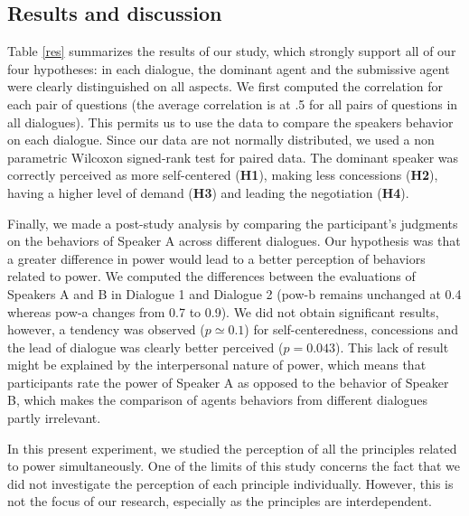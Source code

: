 \documentclass{llncs}
\begin{document}
	\subsection{Results and discussion}
		\vspace{-.5em} 
	Table  \ref{res} summarizes the results of our study, which strongly support all of our four hypotheses: in each dialogue, the dominant agent and the submissive agent were clearly distinguished on all aspects. We first computed the correlation for each pair of questions (the average correlation is at .5 for all pairs of questions in all dialogues). This permits us to use the data to compare the speakers behavior on each dialogue. Since our data are not normally distributed, we used a non parametric Wilcoxon signed-rank test for paired data. The dominant speaker was correctly perceived as more self-centered (\textbf{H1}), making less concessions (\textbf{H2}), having a higher level of demand (\textbf{H3}) and leading the negotiation (\textbf{H4}).
	
	Finally, we made a post-study analysis by comparing the participant's judgments on the behaviors of Speaker A across different dialogues. Our hypothesis was that a greater difference in power would lead to a better perception of behaviors related to power. We computed the differences between the evaluations of Speakers A and B in Dialogue 1 and Dialogue 2 (pow-b remains unchanged at 0.4 whereas pow-a changes from 0.7 to 0.9). We did not obtain significant results, however, a tendency was observed ($p\simeq 0.1$) for 
	self-centeredness, concessions and the lead of dialogue was clearly better perceived ($p=0.043$). This lack of result might be explained by the interpersonal nature of power, which means that participants rate the power of Speaker A as opposed to the behavior of Speaker B, which makes the comparison of agents behaviors from different dialogues partly irrelevant.
	
	In this present experiment, we studied the perception of all the principles related to power simultaneously. One of the limits of this study concerns the fact that we did not investigate the perception of each principle individually. However, this is not the focus of our research, especially as the principles are interdependent.
	
\end{document}
